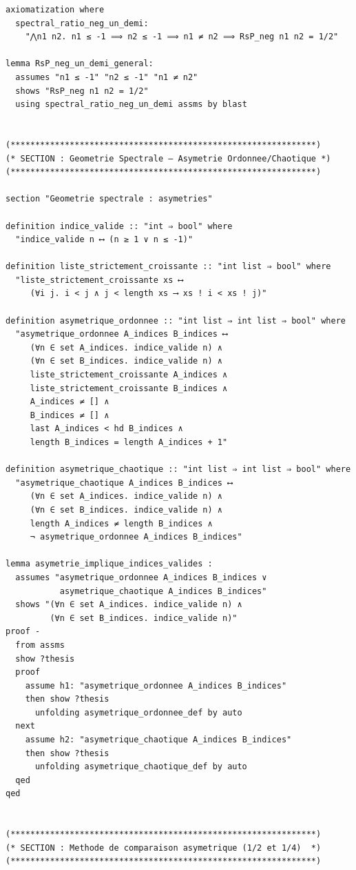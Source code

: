 \documentclass[a4paper,11pt]{article}
\begin{document}
\begin{holcode}[title={\textcolor{white}{File: methode\_spectral.thy -- Part 3/4}}]
\begin{lstlisting}
axiomatization where
  spectral_ratio_neg_un_demi:
    "⋀n1 n2. n1 ≤ -1 ⟹ n2 ≤ -1 ⟹ n1 ≠ n2 ⟹ RsP_neg n1 n2 = 1/2"

lemma RsP_neg_un_demi_general:
  assumes "n1 ≤ -1" "n2 ≤ -1" "n1 ≠ n2"
  shows "RsP_neg n1 n2 = 1/2"
  using spectral_ratio_neg_un_demi assms by blast


(**************************************************************)
(* SECTION : Geometrie Spectrale — Asymetrie Ordonnee/Chaotique *)
(**************************************************************)

section "Geometrie spectrale : asymetries"

definition indice_valide :: "int ⇒ bool" where
  "indice_valide n ⟷ (n ≥ 1 ∨ n ≤ -1)"

definition liste_strictement_croissante :: "int list ⇒ bool" where
  "liste_strictement_croissante xs ⟷
     (∀i j. i < j ∧ j < length xs ⟶ xs ! i < xs ! j)"

definition asymetrique_ordonnee :: "int list ⇒ int list ⇒ bool" where
  "asymetrique_ordonnee A_indices B_indices ⟷
     (∀n ∈ set A_indices. indice_valide n) ∧
     (∀n ∈ set B_indices. indice_valide n) ∧
     liste_strictement_croissante A_indices ∧
     liste_strictement_croissante B_indices ∧
     A_indices ≠ [] ∧
     B_indices ≠ [] ∧
     last A_indices < hd B_indices ∧
     length B_indices = length A_indices + 1"

definition asymetrique_chaotique :: "int list ⇒ int list ⇒ bool" where
  "asymetrique_chaotique A_indices B_indices ⟷
     (∀n ∈ set A_indices. indice_valide n) ∧
     (∀n ∈ set B_indices. indice_valide n) ∧
     length A_indices ≠ length B_indices ∧
     ¬ asymetrique_ordonnee A_indices B_indices"

lemma asymetrie_implique_indices_valides :
  assumes "asymetrique_ordonnee A_indices B_indices ∨
           asymetrique_chaotique A_indices B_indices"
  shows "(∀n ∈ set A_indices. indice_valide n) ∧
         (∀n ∈ set B_indices. indice_valide n)"
proof -
  from assms
  show ?thesis
  proof
    assume h1: "asymetrique_ordonnee A_indices B_indices"
    then show ?thesis
      unfolding asymetrique_ordonnee_def by auto
  next
    assume h2: "asymetrique_chaotique A_indices B_indices"
    then show ?thesis
      unfolding asymetrique_chaotique_def by auto
  qed
qed


(**************************************************************)
(* SECTION : Methode de comparaison asymetrique (1/2 et 1/4)  *)
(**************************************************************)


\end{lstlisting}
\end{holcode}
\end{document}
